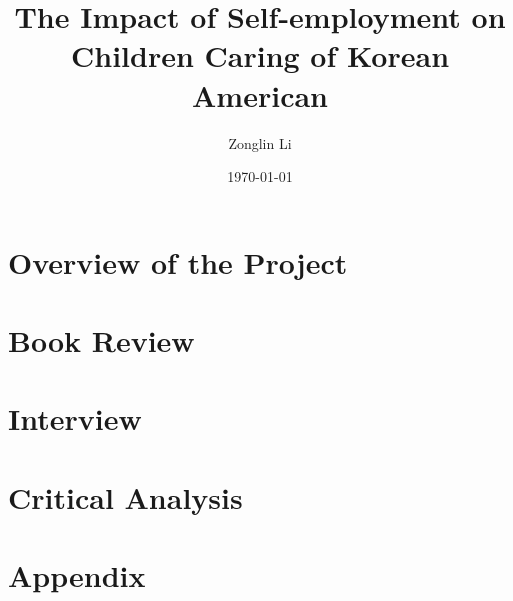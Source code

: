 \documentclass[a4paper,24pt,openany]{article}
\title{\Huge The Impact of Self-employment on Children Caring of Korean
American}
\date{\today}
\author{Zonglin Li}
\begin{document}
\maketitle

\abstract{\large}
\newpage

\section{Overview of the Project}
\large
\section{Book Review}
\large
\section{Interview}
\large
\section{Critical Analysis}
\large

\newpage
\appendix
\section{Appendix}




\end{document}
